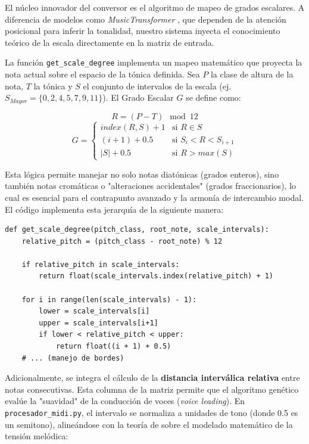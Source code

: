 \documentclass[12pt]{report}
\begin{document}
El núcleo innovador del conversor es el algoritmo de mapeo de grados escalares. A diferencia de modelos como \textit{MusicTransformer} \cite{huang2018music}, que dependen de la atención posicional para inferir la tonalidad, nuestro sistema inyecta el conocimiento teórico de la escala directamente en la matriz de entrada.

La función \texttt{get\_scale\_degree} implementa un mapeo matemático que proyecta la nota actual sobre el espacio de la tónica definida. Sea $P$ la clase de altura de la nota, $T$ la tónica y $S$ el conjunto de intervalos de la escala (ej. $S_{Mayor} = \{0, 2, 4, 5, 7, 9, 11\}$). El Grado Escalar $G$ se define como:

\begin{equation}
R = (P - T) \mod 12
\end{equation}
\begin{equation}
G = 
\begin{cases} 
index(R, S) + 1 & \text{si } R \in S \\
(i + 1) + 0.5 & \text{si } S_i < R < S_{i+1} \\
|S| + 0.5 & \text{si } R > max(S)
\end{cases}
\end{equation}

Esta lógica permite manejar no solo notas diatónicas (grados enteros), sino también notas cromáticas o "alteraciones accidentales" (grados fraccionarios), lo cual es esencial para el contrapunto avanzado y la armonía de intercambio modal. El código implementa esta jerarquía de la siguiente manera:

\begin{verbatim}
def get_scale_degree(pitch_class, root_note, scale_intervals):
    relative_pitch = (pitch_class - root_note) % 12
    
    if relative_pitch in scale_intervals:
        return float(scale_intervals.index(relative_pitch) + 1)
    
    for i in range(len(scale_intervals) - 1):
        lower = scale_intervals[i]
        upper = scale_intervals[i+1]
        if lower < relative_pitch < upper:
            return float((i + 1) + 0.5)
    # ... (manejo de bordes)
\end{verbatim}

Adicionalmente, se integra el cálculo de la \textbf{distancia interválica relativa} entre notas consecutivas. Esta columna de la matriz permite que el algoritmo genético evalúe la "suavidad" de la conducción de voces (\textit{voice leading}). En \texttt{procesador\_midi.py}, el intervalo se normaliza a unidades de tono (donde 0.5 es un semitono), alineándose con la teoría de \cite{chew2014mathematical} sobre el modelado matemático de la tensión melódica:
\end{document}
